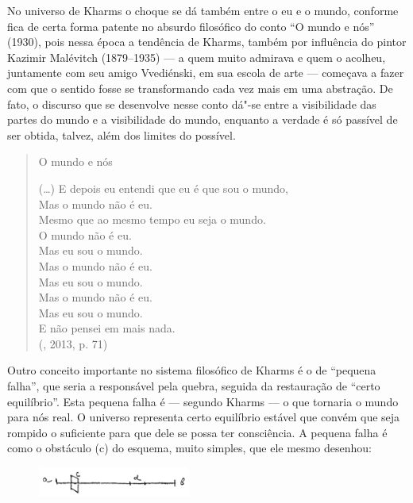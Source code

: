 No universo de Kharms o choque se dá também entre o eu e o mundo,
conforme fica de certa forma patente no absurdo filosófico do conto ``O
mundo e nós'' (1930), pois nessa época a tendência de Kharms, também por
influência do pintor Kazimir Malévitch (1879--1935) --- a quem muito admirava e quem o
acolheu, juntamente com seu amigo Vvediénski, em sua escola de arte ---
começava a fazer com que o sentido fosse se transformando cada vez mais
em uma abstração. De fato, o discurso que se desenvolve nesse conto
dá"-se entre a visibilidade das partes do mundo e a visibilidade do
mundo, enquanto a verdade é só passível de ser obtida, talvez, além dos
limites do possível.

\begin{verse}
O mundo e nós

(\ldots{})
E depois eu entendi que eu é que sou o mundo,\\
Mas o mundo não é eu.\\ 
Mesmo que ao mesmo tempo eu seja o mundo.\\
O mundo não é eu.\\
Mas eu sou o mundo.\\
Mas o mundo não é eu.\\
Mas eu sou o mundo.\\
Mas o mundo não é eu.\\
Mas eu sou o mundo.\\
E não pensei em mais nada.\\

(, 2013, p. 71)


\end{verse}

Outro conceito importante no sistema filosófico de Kharms é o de
``pequena falha'', que seria a responsável pela quebra, seguida da
restauração de ``certo equilíbrio''. Esta pequena falha é --- segundo
Kharms --- o que tornaria o mundo para nós real. O universo representa
certo equilíbrio estável que convém que seja rompido o suficiente para
que dele se possa ter consciência. A pequena falha é como o obstáculo
(c) do esquema, muito simples, que ele mesmo desenhou:

\begin{figure}[!ht]
\centering
  \includegraphics[width=50mm]{./imgs/grafico4.jpg}
\end{figure}

